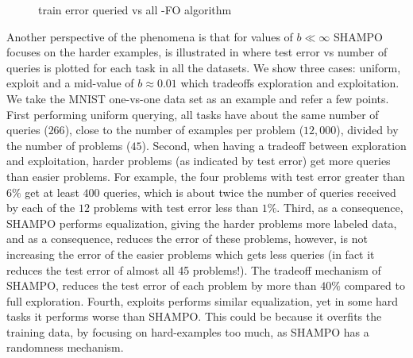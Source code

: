 \begin{figure}[!htb]
\begin{centering}
\caption{train error queried vs all -FO algorithm}
\label{fig:queried}
\end{centering}
\vspace{-0.5cm}
\end{figure}


Another perspective of the phenomena is that for values of $b\ll \infty$ SHAMPO focuses on the harder 
examples, is illustrated in  where test error vs number of queries is plotted for each 
task in all the datasets. We show three cases: uniform, exploit and a mid-value of $b\approx 0.01$ which 
tradeoffs exploration and exploitation. We take the MNIST one-vs-one data set as an example and 
refer a few points. First performing uniform querying, all 
tasks have about the same number of queries ($266$), close to the number of examples per problem 
($12,000$), divided by the number of problems ($45$). Second, when having a tradeoff between exploration 
and exploitation, harder problems (as indicated by test error) get more queries than easier problems. 
For example, the four problems with test error greater than $6\%$ get at least $400$ queries, which is 
about twice the number of queries received by each of the $12$ problems with test error less than $1\%$. 
Third, as a consequence, SHAMPO performs equalization, giving the harder problems more labeled data, 
and as a consequence, reduces the error of these problems, however, is not increasing the error of the 
easier problems which gets less queries (in fact it reduces the test error of almost all 45 problems!). 
The tradeoff mechanism of SHAMPO, reduces the test error of each problem by more than $40\%$ 
compared to full exploration. Fourth, exploits performs similar equalization, yet in some hard tasks it 
performs worse than SHAMPO. This could be because it overfits the training data, by focusing on 
hard-examples too much, as SHAMPO has a randomness mechanism.


